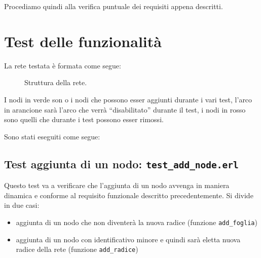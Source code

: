 \documentclass[italian]{memoir}
\begin{document}
Procediamo quindi alla verifica puntuale dei requisiti appena descritti.

\section{Test delle funzionalità}

La rete testata è formata come segue:
\begin{figure}[H]
\caption{Struttura della rete.} 
\end{figure}
I nodi in verde son o i nodi che possono esser aggiunti durante i vari test, l'arco in arancione sarà l'arco che verrà ``disabilitato'' durante il test, i nodi in rosso sono quelli che durante i test possono esser rimossi. 

Sono stati eseguiti come segue:

\subsection{Test aggiunta di un nodo: \texttt{test\_add\_node.erl}}

Questo test va a verificare che l'aggiunta di un nodo avvenga in maniera dinamica e conforme al requisito funzionale descritto precedentemente.
Si divide in due casi:
\begin{itemize}
\item aggiunta di un nodo che non diventerà la nuova radice (funzione \texttt{add\_foglia})
\item aggiunta di un nodo con identificativo minore e quindi sarà eletta nuova radice della rete (funzione \texttt{add\_radice})
\end{itemize}
\end{document}
